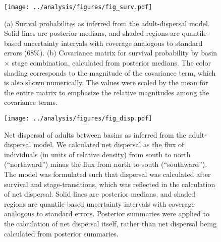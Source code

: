 \documentclass[11pt]{article}
\begin{document}
\clearpage
\begin{figure}
\centering
\texttt{[image: ../analysis/figures/fig\_surv.pdf]}
\caption{\label{fig:surv}
(a) Surival probabilites as inferred from the adult-dispersal model.
Solid lines are posterior medians,
and shaded regions are quantile-based uncertainty intervals
with coverage analogous to standard errors (68\%).
(b) Covariance matrix for survival probability by basin $\times$ stage combination,
calculated from posterior medians.
The color shading corresponds to the magnitude of the covariance term,
which is also shown numerically. 
The values were scaled by the mean for the entire matrix to emphasize 
the relative magnitudes among the covariance terms.
}
\end{figure}
\clearpage

\clearpage
\begin{figure}
\centering
\texttt{[image: ../analysis/figures/fig\_disp.pdf]}
\caption{\label{fig:disp}
Net dispersal of adults between basins as inferred from the adult-dispersal model.
We calculated net dispersal as the flux of individuals (in units of relative density)
from south to north (``northward'') minus the flux from north to south (``southward'').
The model was formulated such that dispersal was calculated after survival and stage-transitions,
which was reflected in the calculation of net dispersal.
Solid lines are posterior medians,
and shaded regions are quantile-based uncertainty intervals
with coverage analogous to standard errors.
Posterior summaries were applied to the calculation of net dispersal itself,
rather than net dispersal being calculated from posterior summaries.
}
\end{figure}
\clearpage
\end{document}

